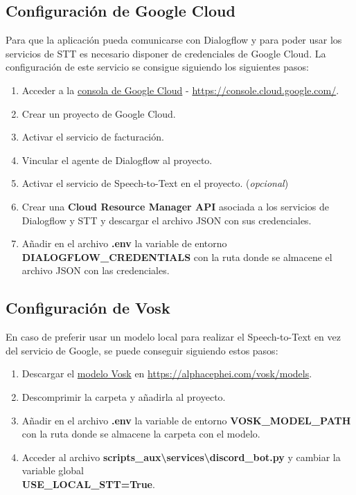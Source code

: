     \subsection{Configuración de Google Cloud}

        Para que la aplicación pueda comunicarse con Dialogflow y para poder usar los servicios de STT es necesario disponer de credenciales de Google Cloud. 
        La configuración de este servicio se consigue siguiendo los siguientes pasos:
        \begin{enumerate}
            \item Acceder a la \href{https://console.cloud.google.com/}{consola de Google Cloud} - \url{https://console.cloud.google.com/}.
            \item Crear un proyecto de Google Cloud.
            \item Activar el servicio de facturación.
            \item Vincular el agente de Dialogflow al proyecto.
            \item Activar el servicio de Speech-to-Text en el proyecto. (\textit{opcional})
            \item Crear una \textbf{Cloud Resource Manager API} asociada a los servicios de Dialogflow y STT y descargar el archivo JSON con sus credenciales.
            \item Añadir en el archivo \textbf{.env} la variable de entorno \textbf{DIALOGFLOW\_CREDENTIALS} con la ruta donde se almacene el archivo JSON con las credenciales.
        \end{enumerate}

    \subsection{Configuración de Vosk}

        En caso de preferir usar un modelo local para realizar el Speech-to-Text en vez del servicio de Google, se puede conseguir siguiendo estos pasos:
        \begin{enumerate}
            \item Descargar el \href{https://alphacephei.com/vosk/models}{modelo Vosk} en \url{https://alphacephei.com/vosk/models}.
            \item Descomprimir la carpeta y añadirla al proyecto.
            \item Añadir en el archivo \textbf{.env} la variable de entorno \textbf{VOSK\_MODEL\_PATH} con la ruta donde se almacene la carpeta con el modelo.
            \item Acceder al archivo \textbf{scripts\_aux\textbackslash{}services\textbackslash{}discord\_bot.py} y cambiar la variable global \\\textbf{USE\_LOCAL\_STT=True}.
        \end{enumerate}

